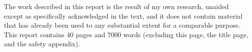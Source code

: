 
\begin{declaration}

    The work described in this report is the result of my own research, unaided except as specifically acknowledged in the text, and it does not contain material that has already been used to any substantial extent for a comparable purpose. This report contains 40 pages and 7000 words (excluding this page, the title page, and the safety appendix).


\end{declaration}

